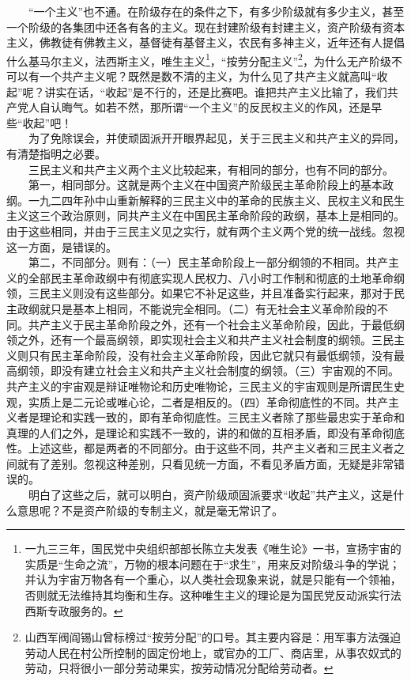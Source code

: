 \documentclass[cn,11pt,chinese]{elegantbook}
\begin{document}
　　“一个主义”也不通。在阶级存在的条件之下，有多少阶级就有多少主义，甚至一个阶级的各集团中还各有各的主义。现在封建阶级有封建主义，资产阶级有资本主义，佛教徒有佛教主义，基督徒有基督主义，农民有多神主义，近年还有人提倡什么基马尔主义，法西斯主义，唯生主义\footnote[22]{ 一九三三年，国民党中央组织部部长陈立夫发表《唯生论》一书，宣扬宇宙的实质是“生命之流”，万物的根本问题在于“求生”，用来反对阶级斗争的学说；并认为宇宙万物各有一个重心，以人类社会现象来说，就是只能有一个领袖，否则就无法维持其均衡和生存。这种唯生主义的理论是为国民党反动派实行法西斯专政服务的。}，“按劳分配主义”\footnote[23]{ 山西军阀阎锡山曾标榜过“按劳分配”的口号。其主要内容是：用军事方法强迫劳动人民在村公所控制的固定份地上，或官办的工厂、商店里，从事农奴式的劳动，只将很小一部分劳动果实，按劳动情况分配给劳动者。}，为什么无产阶级不可以有一个共产主义呢？既然是数不清的主义，为什么见了共产主义就高叫“收起”呢？讲实在话，“收起”是不行的，还是比赛吧。谁把共产主义比输了，我们共产党人自认晦气。如若不然，那所谓“一个主义”的反民权主义的作风，还是早些“收起”吧！\\
　　为了免除误会，并使顽固派开开眼界起见，关于三民主义和共产主义的异同，有清楚指明之必要。\\
　　三民主义和共产主义两个主义比较起来，有相同的部分，也有不同的部分。\\
　　第一，相同部分。这就是两个主义在中国资产阶级民主革命阶段上的基本政纲。一九二四年孙中山重新解释的三民主义中的革命的民族主义、民权主义和民生主义这三个政治原则，同共产主义在中国民主革命阶段的政纲，基本上是相同的。由于这些相同，并由于三民主义见之实行，就有两个主义两个党的统一战线。忽视这一方面，是错误的。\\
　　第二，不同部分。则有：（一）民主革命阶段上一部分纲领的不相同。共产主义的全部民主革命政纲中有彻底实现人民权力、八小时工作制和彻底的土地革命纲领，三民主义则没有这些部分。如果它不补足这些，并且准备实行起来，那对于民主政纲就只是基本上相同，不能说完全相同。（二）有无社会主义革命阶段的不同。共产主义于民主革命阶段之外，还有一个社会主义革命阶段，因此，于最低纲领之外，还有一个最高纲领，即实现社会主义和共产主义社会制度的纲领。三民主义则只有民主革命阶段，没有社会主义革命阶段，因此它就只有最低纲领，没有最高纲领，即没有建立社会主义和共产主义社会制度的纲领。（三）宇宙观的不同。共产主义的宇宙观是辩证唯物论和历史唯物论，三民主义的宇宙观则是所谓民生史观，实质上是二元论或唯心论，二者是相反的。（四）革命彻底性的不同。共产主义者是理论和实践一致的，即有革命彻底性。三民主义者除了那些最忠实于革命和真理的人们之外，是理论和实践不一致的，讲的和做的互相矛盾，即没有革命彻底性。上述这些，都是两者的不同部分。由于这些不同，共产主义者和三民主义者之间就有了差别。忽视这种差别，只看见统一方面，不看见矛盾方面，无疑是非常错误的。\\
　　明白了这些之后，就可以明白，资产阶级顽固派要求“收起”共产主义，这是什么意思呢？不是资产阶级的专制主义，就是毫无常识了。\\
\end{document}
